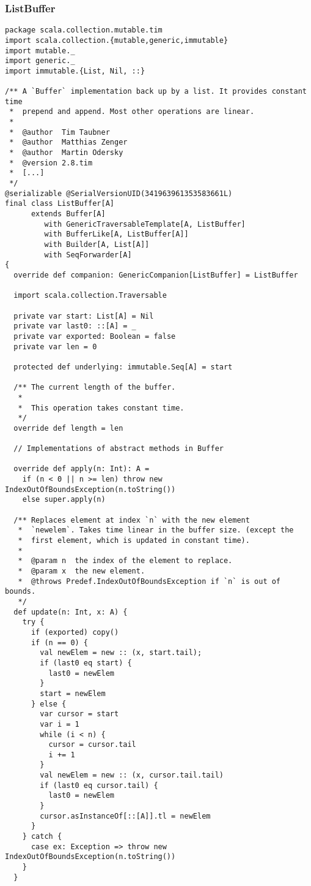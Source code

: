 \subsubsection{ListBuffer}
\begin{lstlisting}
package scala.collection.mutable.tim
import scala.collection.{mutable,generic,immutable}
import mutable._
import generic._
import immutable.{List, Nil, ::}

/** A `Buffer` implementation back up by a list. It provides constant time
 *  prepend and append. Most other operations are linear.
 *
 *  @author  Tim Taubner
 *  @author  Matthias Zenger
 *  @author  Martin Odersky
 *  @version 2.8.tim
 *  [...]
 */
@serializable @SerialVersionUID(341963961353583661L)
final class ListBuffer[A]
      extends Buffer[A]
         with GenericTraversableTemplate[A, ListBuffer]
         with BufferLike[A, ListBuffer[A]]
         with Builder[A, List[A]]
         with SeqForwarder[A]
{
  override def companion: GenericCompanion[ListBuffer] = ListBuffer

  import scala.collection.Traversable

  private var start: List[A] = Nil
  private var last0: ::[A] = _
  private var exported: Boolean = false
  private var len = 0

  protected def underlying: immutable.Seq[A] = start

  /** The current length of the buffer.
   *
   *  This operation takes constant time.
   */
  override def length = len

  // Implementations of abstract methods in Buffer

  override def apply(n: Int): A =
    if (n < 0 || n >= len) throw new IndexOutOfBoundsException(n.toString())
    else super.apply(n)

  /** Replaces element at index `n` with the new element
   *  `newelem`. Takes time linear in the buffer size. (except the
   *  first element, which is updated in constant time).
   *
   *  @param n  the index of the element to replace.
   *  @param x  the new element.
   *  @throws Predef.IndexOutOfBoundsException if `n` is out of bounds.
   */
  def update(n: Int, x: A) {
    try {
      if (exported) copy()
      if (n == 0) {
        val newElem = new :: (x, start.tail);
        if (last0 eq start) {
          last0 = newElem
        }
        start = newElem
      } else {
        var cursor = start
        var i = 1
        while (i < n) {
          cursor = cursor.tail
          i += 1
        }
        val newElem = new :: (x, cursor.tail.tail)
        if (last0 eq cursor.tail) {
          last0 = newElem
        }
        cursor.asInstanceOf[::[A]].tl = newElem
      }
    } catch {
      case ex: Exception => throw new IndexOutOfBoundsException(n.toString())
    }
  }


\end{lstlisting}
